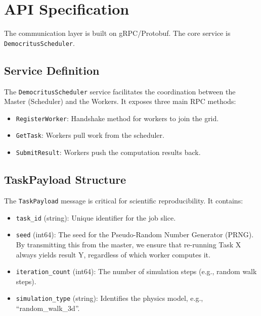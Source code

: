 \section{API Specification}

The communication layer is built on gRPC/Protobuf. The core service is \texttt{DemocritusScheduler}.

\subsection{Service Definition}
The \texttt{DemocritusScheduler} service facilitates the coordination between the Master (Scheduler) and the Workers. It exposes three main RPC methods:
\begin{itemize}
    \item \texttt{RegisterWorker}: Handshake method for workers to join the grid.
    \item \texttt{GetTask}: Workers pull work from the scheduler.
    \item \texttt{SubmitResult}: Workers push the computation results back.
\end{itemize}

\subsection{TaskPayload Structure}
The \texttt{TaskPayload} message is critical for scientific reproducibility. It contains:
\begin{itemize}
    \item \texttt{task\_id} (string): Unique identifier for the job slice.
    \item \texttt{seed} (int64): The seed for the Pseudo-Random Number Generator (PRNG). By transmitting this from the master, we ensure that re-running Task X always yields result Y, regardless of which worker computes it.
    \item \texttt{iteration\_count} (int64): The number of simulation steps (e.g., random walk steps).
    \item \texttt{simulation\_type} (string): Identifies the physics model, e.g., ``random\_walk\_3d''.
\end{itemize}
